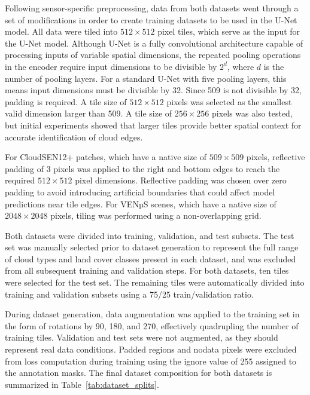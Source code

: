 Following sensor-specific preprocessing, data from both datasets went through a set of modifications in order to create training datasets to be used in the U-Net model. All data were tiled into $512 \times 512$ pixel tiles, which serve as the input for the U-Net model. Although U-Net is a fully convolutional architecture capable of processing inputs of variable spatial dimensions, the repeated pooling operations in the encoder require input dimensions to be divisible by $2^d$, where $d$ is the number of pooling layers. For a standard U-Net with five pooling layers, this means input dimensions must be divisible by 32. Since 509 is not divisible by 32, padding is required. A tile size of $512 \times 512$ pixels was selected as the smallest valid dimension larger than 509. A tile size of $256 \times 256$ pixels was also tested, but initial experiments showed that larger tiles provide better spatial context for accurate identification of cloud edges.

For CloudSEN12+ patches, which have a native size of $509 \times 509$ pixels, reflective padding of 3 pixels was applied to the right and bottom edges to reach the required $512 \times 512$ pixel dimensions. Reflective padding was chosen over zero padding to avoid introducing artificial boundaries that could affect model predictions near tile edges. For VENµS scenes, which have a native size of $2048 \times 2048$ pixels, tiling was performed using a non-overlapping grid.

Both datasets were divided into training, validation, and test subsets. The test set was manually selected prior to dataset generation to represent the full range of cloud types and land cover classes present in each dataset, and was excluded from all subsequent training and validation steps. For both datasets, ten tiles were selected for the test set. The remaining tiles were automatically divided into training and validation subsets using a 75/25 train/validation ratio.

During dataset generation, data augmentation was applied to the training set in the form of rotations by 90\textdegree, 180\textdegree, and 270\textdegree, effectively quadrupling the number of training tiles. Validation and test sets were not augmented, as they should represent real data conditions. Padded regions and nodata pixels were excluded from loss computation during training using the ignore value of 255 assigned to the annotation masks. The final dataset composition for both datasets is summarized in Table~\ref{tab:dataset_splits}.

